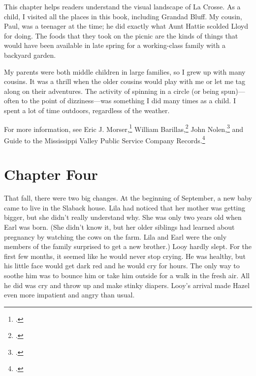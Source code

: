\documentclass[
  american,
  letterpaper,
]{book}
\begin{document}
This chapter helps readers understand the visual landscape of La Crosse.
As a child, I visited all the places in this book, including Grandad
Bluff. My cousin, Paul, was a teenager at the time; he did exactly what
Aunt Hattie scolded Lloyd for doing. The foods that they took on the
picnic are the kinds of things that would have been available in late
spring for a working-class family with a backyard garden.

My parents were both middle children in large families, so I grew up
with many cousins. It was a thrill when the older cousins would play
with me or let me tag along on their adventures. The activity of
spinning in a circle (or being spun)---often to the point of
dizziness---was something I did many times as a child. I spent a lot of
time outdoors, regardless of the weather.

For more information, see Eric J. Morser,\footnote{.}
William Barillas,\footnote{.} John
Nolen,\footnote{.}
and Guide to the Mississippi Valley Public Service Company
Records.\footnote{.}


\chapter{Chapter Four}\label{chapter-four}

That fall, there were two big changes. At the beginning of September, a
new baby came to live in the Slaback house. Lila had noticed that her
mother was getting bigger, but she didn't really understand why. She was
only two years old when Earl was born. (She didn't know it, but her
older siblings had learned about pregnancy by watching the cows on the
farm. Lila and Earl were the only members of the family surprised to get
a new brother.) Looy hardly slept. For the first few months, it seemed
like he would never stop crying. He was healthy, but his little face
would get dark red and he would cry for hours. The only way to soothe
him was to bounce him or take him outside for a walk in the fresh air.
All he did was cry and throw up and make stinky diapers. Looy's arrival
made Hazel even more impatient and angry than usual.
\end{document}
